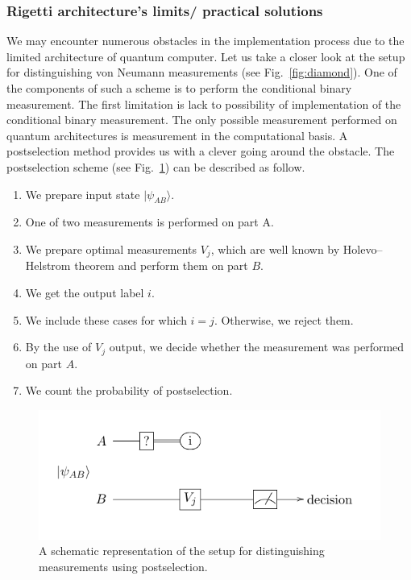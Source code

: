 \documentclass[preprint,12pt, a4paper]{elsarticle}
\newcommand{\ket}[1]{\ensuremath{|#1\rangle}}
\newcommand{\1}{{\rm 1\hspace{-0.9mm}l}}
\begin{document}
\subsubsection{Rigetti architecture's limits/ practical solutions}


We may encounter numerous obstacles in the implementation process due to the 
limited architecture of quantum computer. 
Let us take a closer look at the setup for distinguishing von Neumann 
measurements (see Fig.~\ref{fig:diamond}). One of the components of such a 
scheme is to perform the conditional binary measurement. The first limitation 
is lack to possibility of implementation of the conditional binary measurement. 
The only possible measurement performed on quantum architectures is measurement 
in the computational basis. 
A postselection method provides us with a clever going around the obstacle. The 
postselection  scheme (see Fig.~\ref{postselection})  can be described as 
follow. 


\begin{enumerate}
	\item We prepare input state $\ket{\psi_{AB}}$.
	\item One of two measurements is performed on part A.
	\item We prepare optimal measurements $V_j$, which are well known by 
	Holevo--Helstrom theorem and perform them on part $B$.
	\item We get the output label $i$.
	\item We include these cases for which $i = j$. Otherwise, we reject them.
	\item By the use of $V_j$ output, we decide whether the measurement was 
	performed on part $A$.
	\item We count the probability of postselection.
\end{enumerate}


\begin{figure}[h!]
	\includegraphics[scale=1.5]{onequbit.pdf}
	\caption{A schematic representation of the setup for distinguishing
		measurements using postselection.}
	\label{postselection}
\end{figure} 
\end{document}
